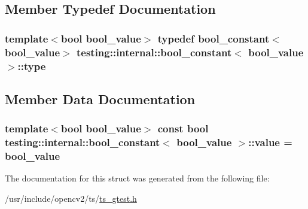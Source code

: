 \subsection{Member Typedef Documentation}
\hypertarget{structtesting_1_1internal_1_1bool__constant_aba6d09ecf7eecea6c93480f0d627a167}{
\subsubsection[{type}]{\setlength{\rightskip}{0pt plus 5cm}template$<$bool bool\-\_\-value$>$ typedef {\bf bool\-\_\-constant}$<$bool\-\_\-value$>$ {\bf testing\-::internal\-::bool\-\_\-constant}$<$ bool\-\_\-value $>$\-::{\bf type}}}\label{structtesting_1_1internal_1_1bool__constant_aba6d09ecf7eecea6c93480f0d627a167}


\subsection{Member Data Documentation}
\hypertarget{structtesting_1_1internal_1_1bool__constant_a499fba6576296b04d99690a486424b32}{
\subsubsection[{value}]{\setlength{\rightskip}{0pt plus 5cm}template$<$bool bool\-\_\-value$>$ const bool {\bf testing\-::internal\-::bool\-\_\-constant}$<$ bool\-\_\-value $>$\-::value = bool\-\_\-value\hspace{0.3cm}{\ttfamily [static]}}}\label{structtesting_1_1internal_1_1bool__constant_a499fba6576296b04d99690a486424b32}


The documentation for this struct was generated from the following file\-:\begin{DoxyCompactItemize}
\item 
/usr/include/opencv2/ts/\hyperlink{ts__gtest_8h}{ts\-\_\-gtest.\-h}\end{DoxyCompactItemize}
